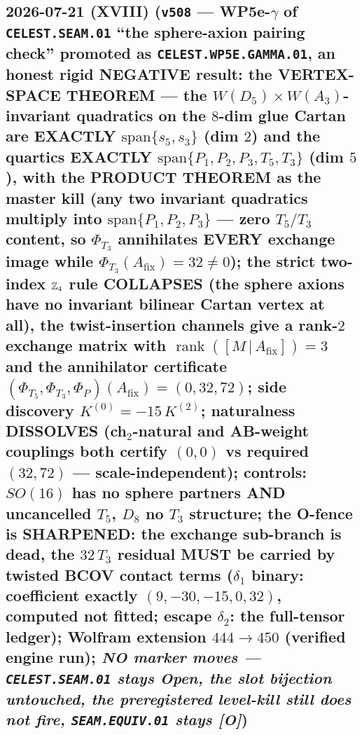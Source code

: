 \documentclass[11pt]{article}
\providecommand{\mO}{\textbf{[O]}}\providecommand{\mX}{\textbf{[X]}}
\begin{document}
\subsection*{2026-07-21 (XVIII) (\texttt{v508} --- WP5e-$\gamma$ of \texttt{CELEST.SEAM.01} ``the sphere-axion pairing check'' promoted as \texttt{CELEST.WP5E.GAMMA.01}, an honest rigid NEGATIVE result: the VERTEX-SPACE THEOREM --- the $W(D_5){\times}W(A_3)$-invariant quadratics on the $8$-dim glue Cartan are EXACTLY $\mathrm{span}\{s_5,s_3\}$ (dim $2$) and the quartics EXACTLY $\mathrm{span}\{P_1,P_2,P_3,T_5,T_3\}$ (dim $5$), with the PRODUCT THEOREM as the master kill (any two invariant quadratics multiply into $\mathrm{span}\{P_1,P_2,P_3\}$ --- zero $T_5/T_3$ content, so $\Phi_{T_3}$ annihilates EVERY exchange image while $\Phi_{T_3}(A_{\mathrm{fix}})=32\neq0$); the strict two-index $\mathbb{Z}_4$ rule COLLAPSES (the sphere axions have no invariant bilinear Cartan vertex at all), the twist-insertion channels give a rank-$2$ exchange matrix with $\operatorname{rank}([M\,|\,A_{\mathrm{fix}}])=3$ and the annihilator certificate $(\Phi_{T_5},\Phi_{T_3},\Phi_P)(A_{\mathrm{fix}})=(0,32,72)$; side discovery $K^{(0)}=-15\,K^{(2)}$; naturalness DISSOLVES (ch$_2$-natural and AB-weight couplings both certify $(0,0)$ vs required $(32,72)$ --- scale-independent); controls: $SO(16)$ has no sphere partners AND uncancelled $T_5$, $D_8$ no $T_3$ structure; the O-fence is SHARPENED: the exchange sub-branch is dead, the $32\,T_3$ residual MUST be carried by twisted BCOV contact terms ($\delta_1$ binary: coefficient exactly $(9,-30,-15,0,32)$, computed not fitted; escape $\delta_2$: the full-tensor ledger); Wolfram extension $444\to450$ (verified engine run); \emph{NO marker moves --- \texttt{CELEST.SEAM.01} stays Open, the slot bijection untouched, the preregistered level-kill still does not fire, \texttt{SEAM.EQUIV.01} stays \mO})}
\end{document}
